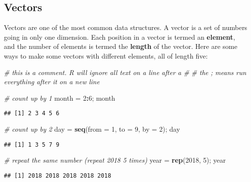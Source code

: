 \documentclass[]{book}
\newenvironment{Shaded}{\begin{snugshade}}{\end{snugshade}}
\newcommand{\KeywordTok}[1]{\textcolor[rgb]{0.13,0.29,0.53}{\textbf{#1}}}
\newcommand{\DataTypeTok}[1]{\textcolor[rgb]{0.13,0.29,0.53}{#1}}
\newcommand{\DecValTok}[1]{\textcolor[rgb]{0.00,0.00,0.81}{#1}}
\newcommand{\StringTok}[1]{\textcolor[rgb]{0.31,0.60,0.02}{#1}}
\newcommand{\CommentTok}[1]{\textcolor[rgb]{0.56,0.35,0.01}{\textit{#1}}}
\newcommand{\OperatorTok}[1]{\textcolor[rgb]{0.81,0.36,0.00}{\textbf{#1}}}
\newcommand{\NormalTok}[1]{#1}
\theoremstyle{definition}
\theoremstyle{definition}
\theoremstyle{definition}
\theoremstyle{remark}
\begin{document}
\subsection{Vectors}\label{vectors}

Vectors are one of the most common data structures. A vector is a set of
numbers going in only one dimension. Each position in a vector is termed
an \textbf{element}, and the number of elements is termed the
\textbf{length} of the vector. Here are some ways to make some vectors
with different elements, all of length five:

\begin{Shaded}
\begin{Highlighting}[]
\CommentTok{# this is a comment. R will ignore all text on a line after a #}
\CommentTok{# the ; means run everything after it on a new line}

\CommentTok{# count up by 1}
\NormalTok{month =}\StringTok{ }\DecValTok{2}\OperatorTok{:}\DecValTok{6}\NormalTok{; month}
\end{Highlighting}
\end{Shaded}

\begin{verbatim}
## [1] 2 3 4 5 6
\end{verbatim}

\begin{Shaded}
\begin{Highlighting}[]
\CommentTok{# count up by 2}
\NormalTok{day =}\StringTok{ }\KeywordTok{seq}\NormalTok{(}\DataTypeTok{from =} \DecValTok{1}\NormalTok{, }\DataTypeTok{to =} \DecValTok{9}\NormalTok{, }\DataTypeTok{by =} \DecValTok{2}\NormalTok{); day}
\end{Highlighting}
\end{Shaded}

\begin{verbatim}
## [1] 1 3 5 7 9
\end{verbatim}

\begin{Shaded}
\begin{Highlighting}[]
\CommentTok{# repeat the same number (repeat 2018 5 times)}
\NormalTok{year =}\StringTok{ }\KeywordTok{rep}\NormalTok{(}\DecValTok{2018}\NormalTok{, }\DecValTok{5}\NormalTok{); year}
\end{Highlighting}
\end{Shaded}

\begin{verbatim}
## [1] 2018 2018 2018 2018 2018
\end{verbatim}
\end{document}
